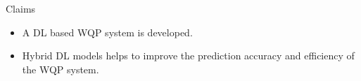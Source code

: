 \begin{frame}[allowframebreaks]{Claims}
\begin{itemize}
	\item A DL based WQP system is developed.
	\item Hybrid DL models helps to improve the prediction accuracy and efficiency of the WQP system.
\end{itemize}
\end{frame}